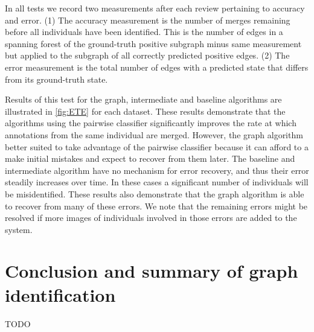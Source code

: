     \Simulation{}

    \Refresh{}

    In all tests we record two measurements after each review pertaining to accuracy and error.
    (1) The accuracy measurement is the number of merges remaining before all individuals have been identified.
    This is the number of edges in a spanning forest of the ground-truth positive subgraph minus same measurement
      but applied to the subgraph of all correctly predicted positive edges.
    (2) The error measurement is the total number of edges with a predicted state that differs from its
      ground-truth state.

    Results of this test for the graph, intermediate and baseline algorithms are illustrated in \cref{fig:ETE}
      for each dataset.
    These results demonstrate that the algorithms using the pairwise classifier significantly improves the rate
      at which annotations from the same individual are merged.
    However, the graph algorithm better suited to take advantage of the pairwise classifier because it can afford
      to a make initial mistakes and expect to recover from them later.
    The baseline and intermediate algorithm have no mechanism for error recovery, and thus their error steadily
      increases over time.
    In these cases a significant number of individuals will be misidentified.
    These results also demonstrate that the graph algorithm is able to recover from many of these errors.
    We note that the remaining errors might be resolved if more images of individuals involved in those errors
      are added to the system.

 
\section{Conclusion and summary of graph identification}\label{sec:graphconclusion}

TODO



